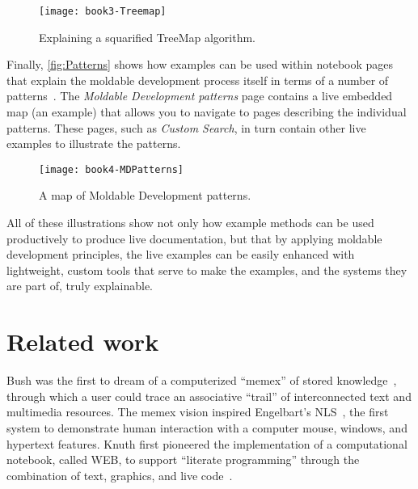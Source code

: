 \documentclass[sigplan,anonymous,review,10pt]{acmart}
\begin{document}
\begin{figure}[h]
  \texttt{[image: book3-Treemap]}
  \caption{Explaining a squarified TreeMap algorithm.}
  \label{fig:Treemap}
\end{figure}

Finally, \autoref{fig:Patterns} shows how examples can be used within notebook pages that explain the moldable development process itself in terms of a number of patterns~\cite{Nier24a}.
The \emph{Moldable Development patterns} page contains a live embedded map (an example) that allows you to navigate to pages describing the individual patterns.
These pages, such as \emph{Custom Search}, in turn contain other live examples to illustrate the patterns.

\begin{figure}[h]
  \texttt{[image: book4-MDPatterns]}
  \caption{A map of Moldable Development patterns.}
  \label{fig:Patterns}
\end{figure}

All of these illustrations show not only how example methods can be used productively to produce live documentation, but that by applying moldable development principles, the live examples can be easily enhanced with lightweight, custom tools that serve to make the examples, and the systems they are part of, truly explainable.


\section{Related work}\label{sec:related}

Bush was the first to dream of a computerized ``memex'' of stored knowledge~\cite{Bush45a}, through which a user could trace an associative ``trail'' of interconnected text and multimedia resources.
The memex vision inspired Engelbart's NLS~\cite{Enge68a}, the first system to demonstrate human interaction with a computer mouse, windows, and hypertext features.
Knuth first pioneered the implementation of a computational notebook, called WEB, to support ``literate programming'' through the combination of text, graphics, and live code~\cite{Knut97a}.
\end{document}
